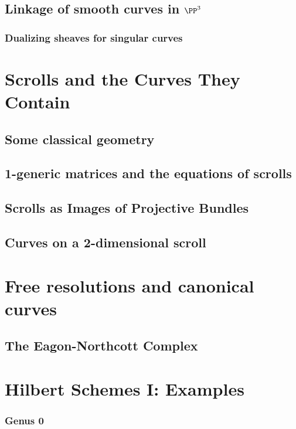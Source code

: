 \begin{theorem}
\section{Linkage of smooth curves in $\PP^3$}\label{SLinkage}\label{linkage section}
\subsection{Dualizing sheaves for singular curves}\label{duality}

\chapter{Scrolls and the Curves They Contain}
\label{ScrollsChapter}
\section{Some classical geometry}\label{daily name}
\section{1-generic matrices and the equations of scrolls}\label{particular name}
\section{Scrolls as Images of Projective Bundles}\label{inscrutable name}
\section{Curves on a 2-dimensional scroll}\label{curves on scrolls}

\chapter{Free resolutions and canonical curves}
\label{SyzygiesChapter}
\section{The Eagon-Northcott Complex}\label{EN section}

\chapter{Hilbert Schemes I: Examples}
\label{HilbertSchemesChapter}
\subsection{Genus 0}\label{degree 4 genus 0}

\end{theorem}
